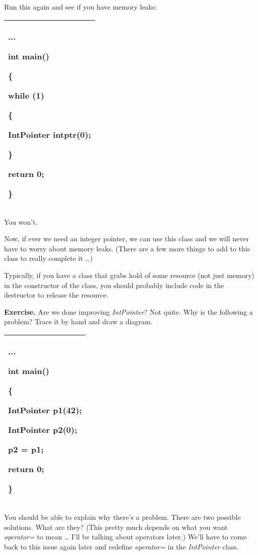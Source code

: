 \documentclass[
]{article}
\begin{document}
Run this again and see if you have memory leaks:

\begin{longtable}[]{@{}l@{}}
\toprule
\endhead
\begin{minipage}[t]{0.97\columnwidth}\raggedright
...

int main()

\{

while (1)

\{

IntPointer intptr(0);

\}

return 0;

\}\strut
\end{minipage}\tabularnewline
\bottomrule
\end{longtable}

You won't.

Now, if ever we need an integer pointer, we can use this class and we
will never have to worry about memory leaks. (There are a few more
things to add to this class to really complete it \ldots)

Typically, if you have a class that grabs hold of some resource (not
just memory) in the constructor of the class, you should probably
include code in the destructor to release the resource.

\textbf{Exercise.} Are we done improving \emph{IntPointer}? Not quite.
Why is the following a problem? Trace it by hand and draw a diagram.

\begin{longtable}[]{@{}l@{}}
\toprule
\endhead
\begin{minipage}[t]{0.97\columnwidth}\raggedright
...

int main()

\{

IntPointer p1(42);

IntPointer p2(0);

p2 = p1;

return 0;

\}\strut
\end{minipage}\tabularnewline
\bottomrule
\end{longtable}

You should be able to explain why there's a problem. There are two
possible solutions. What are they? (This pretty much depends on what you
want \emph{operator=} to mean \ldots{} I'll be talking about operators
later.) We'll have to come back to this issue again later and redefine
\emph{operator=} in the \emph{IntPointer} class.
\end{document}
